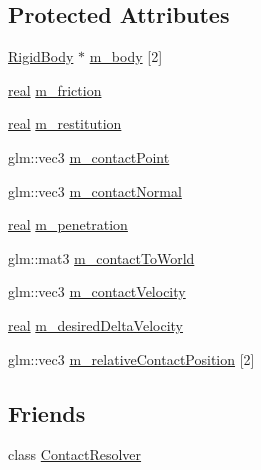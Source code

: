 \subsection*{Protected Attributes}
\begin{DoxyCompactItemize}
\item 
\hyperlink{classrum_1_1_rigid_body}{Rigid\+Body} $\ast$ \hyperlink{classrum_1_1_contact_a119ef7e9e16f64e6d3102a27d4c043dd}{m\+\_\+body} \mbox{[}2\mbox{]}
\item 
\hyperlink{namespacerum_a7e8cca23573d5eaead0f138cbaa4862c}{real} \hyperlink{classrum_1_1_contact_ab226a6190ff85141d7d67851b69c376f}{m\+\_\+friction}
\item 
\hyperlink{namespacerum_a7e8cca23573d5eaead0f138cbaa4862c}{real} \hyperlink{classrum_1_1_contact_a99498377d3d6b5ae69036c29fce0ff05}{m\+\_\+restitution}
\item 
glm\+::vec3 \hyperlink{classrum_1_1_contact_a5e70d4ad5c287cc877be38fd1efd57b0}{m\+\_\+contact\+Point}
\item 
glm\+::vec3 \hyperlink{classrum_1_1_contact_a2e85ae74bc451a99b9443dfe605cf2c4}{m\+\_\+contact\+Normal}
\item 
\hyperlink{namespacerum_a7e8cca23573d5eaead0f138cbaa4862c}{real} \hyperlink{classrum_1_1_contact_ae66eaa462e7faf31c9f1ecd78cf172d3}{m\+\_\+penetration}
\item 
glm\+::mat3 \hyperlink{classrum_1_1_contact_a10b413ee85f533c7e4e2ed13a6599836}{m\+\_\+contact\+To\+World}
\item 
glm\+::vec3 \hyperlink{classrum_1_1_contact_a350a7e23fdbbb38425ba302e9628bf08}{m\+\_\+contact\+Velocity}
\item 
\hyperlink{namespacerum_a7e8cca23573d5eaead0f138cbaa4862c}{real} \hyperlink{classrum_1_1_contact_a55d1f634223ef4deb365d47c3dae9a97}{m\+\_\+desired\+Delta\+Velocity}
\item 
glm\+::vec3 \hyperlink{classrum_1_1_contact_aae0e51d30ae3e1631dd2017ce87812ba}{m\+\_\+relative\+Contact\+Position} \mbox{[}2\mbox{]}
\end{DoxyCompactItemize}
\subsection*{Friends}
\begin{DoxyCompactItemize}
\item 
class \hyperlink{classrum_1_1_contact_a274795e9632d5cb7d5d387fc31136fe5}{Contact\+Resolver}
\end{DoxyCompactItemize}


